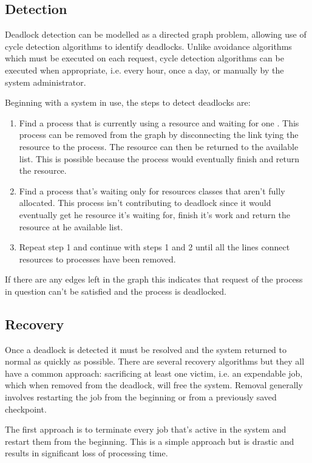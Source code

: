 \documentclass[12pt letter]{report}
\begin{document}
\subsection{Detection}

Deadlock detection can be modelled as a directed graph problem,
allowing use of cycle detection algorithms to identify deadlocks.
Unlike avoidance algorithms which must be executed on each request,
cycle detection algorithms can be executed when appropriate, i.e.
every hour, once a day, or manually by the system administrator.

Beginning with a system in use, the steps to detect deadlocks are:
\begin{enumerate}
  \item Find a process that is currently using a resource and waiting
    for one . This process can be removed from the graph by
    disconnecting the link tying the resource to the process. The
    resource can then be returned to the available list. This is
    possible because the process would eventually finish and return
    the resource.
  \item Find a process that's waiting only for resources classes that
    aren't fully allocated. This process isn't contributing to
    deadlock since it would eventually get he resource it's waiting
    for, finish it's work and return the resource at he available list.
  \item Repeat step 1 and continue with steps 1 and 2 until all the
    lines connect resources to processes have been removed.
\end{enumerate}

If there are any edges left in the graph this indicates that request
of the process in question can't be satisfied and the process is deadlocked.

\subsection{Recovery}

Once a deadlock is detected it must be resolved and the system
returned to normal as quickly as possible. There are several recovery
algorithms but they all have a common approach: sacrificing at least
one victim, i.e. an expendable job, which when removed from the
deadlock, will free the system. Removal generally involves restarting
the job from the beginning or from a previously saved checkpoint.

The first approach is to terminate every job that's active in the
system and restart them from the beginning. This is a simple approach
but is drastic and results in significant loss of processing time.
\end{document}
